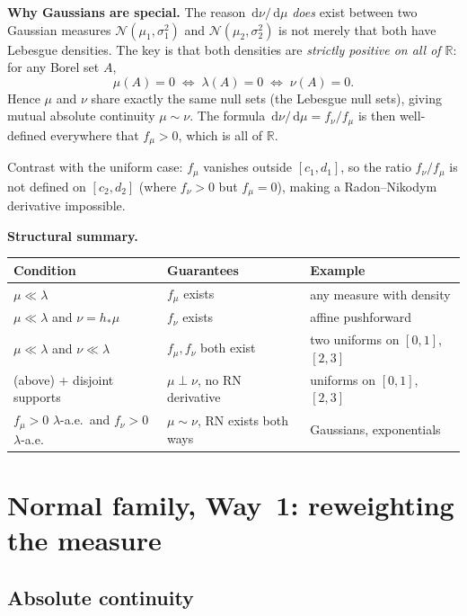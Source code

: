 \documentclass[11pt,a4paper]{article}
\newcommand{\N}{\mathcal{N}}
\newcommand{\dif}{\,\mathrm{d}}
\newcommand{\R}{\mathbb{R}}
\begin{document}
\medskip\noindent\textbf{Why Gaussians are special.}
The reason $\dif\nu/\dif\mu$ \emph{does} exist between two Gaussian measures
$\N(\mu_1,\sigma_1^2)$ and $\N(\mu_2,\sigma_2^2)$ is not merely that both have Lebesgue
densities.  The key is that both densities are \emph{strictly positive on all of $\R$}: for
any Borel set $A$,
\[
  \mu(A)=0 \;\Longleftrightarrow\; \lambda(A)=0 \;\Longleftrightarrow\; \nu(A)=0.
\]
Hence $\mu$ and $\nu$ share exactly the same null sets (the Lebesgue null sets), giving
mutual absolute continuity $\mu\sim\nu$.  The formula
$\dif\nu/\dif\mu = f_\nu/f_\mu$ is then well-defined everywhere that $f_\mu>0$, which is
all of $\R$.

Contrast with the uniform case: $f_\mu$ vanishes outside $[c_1,d_1]$, so the ratio
$f_\nu/f_\mu$ is not defined on $[c_2,d_2]$ (where $f_\nu>0$ but $f_\mu=0$), making a
Radon--Nikodym derivative impossible.

\medskip\noindent\textbf{Structural summary.}

\begin{center}
\renewcommand{\arraystretch}{1.5}
\begin{tabular}{lll}
\toprule
\textbf{Condition} & \textbf{Guarantees} & \textbf{Example} \\
\midrule
$\mu\ll\lambda$ & $f_\mu$ exists & any measure with density \\
$\mu\ll\lambda$ and $\nu=h_*\mu$ & $f_\nu$ exists & affine pushforward \\
$\mu\ll\lambda$ and $\nu\ll\lambda$ & $f_\mu,f_\nu$ both exist & two uniforms on $[0,1]$, $[2,3]$ \\
\quad(above) + disjoint supports & $\mu\perp\nu$, no RN derivative & uniforms on $[0,1]$, $[2,3]$ \\
$f_\mu>0$ $\lambda$-a.e.\ and $f_\nu>0$ $\lambda$-a.e. & $\mu\sim\nu$, RN exists both ways
  & Gaussians, exponentials \\
\bottomrule
\end{tabular}
\end{center}

\section{Normal family, Way~1: reweighting the measure}
\label{sec:normal-way1}

\subsection{Absolute continuity}
\end{document}
